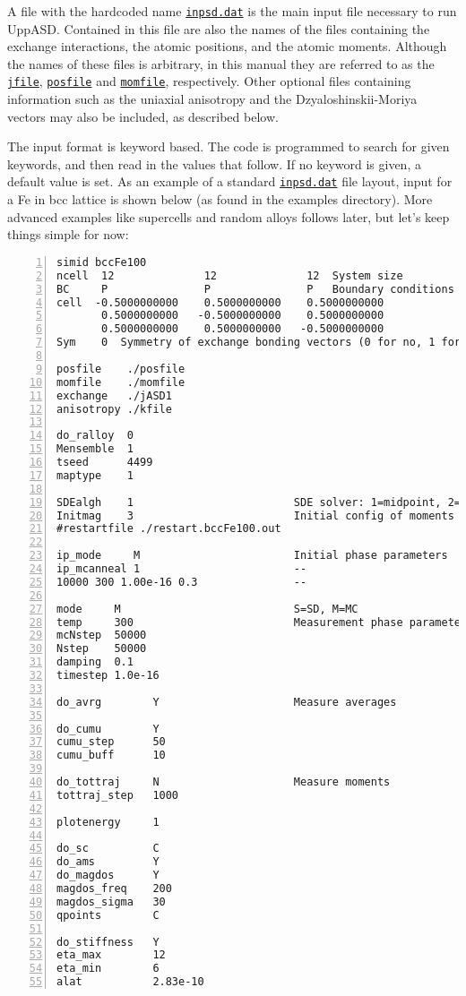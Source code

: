 \documentclass[11pt,fleqn,a4]{book} %
\newcommand{\rfilename}[1]{\hyperref[#1]{\texttt{#1}}}
\begin{document}
A file with the hardcoded name \rfilename{inpsd.dat} is the main input file necessary to run UppASD. Contained in this file are also the names of the files containing the exchange interactions, the atomic positions, and the atomic moments. Although the names of these files is arbitrary, in this manual they are referred to as the \rfilename{jfile}, \rfilename{posfile} and \rfilename{momfile}, respectively. Other optional files containing information such as the uniaxial anisotropy and the Dzyaloshinskii-Moriya vectors may also be included, as described below.

The input format is keyword based. The code is programmed to search for given keywords, and then read in the values that follow. If no keyword is given, a default value is set. As an example of a standard \rfilename{inpsd.dat} file layout, input for a Fe in bcc lattice is shown below (as found in the examples directory). More advanced examples like supercells and random alloys follows later, but let's keep things simple for now:

\begin{Verbatim}[numbers=left]
simid bccFe100                                    
ncell  12              12              12  System size            
BC     P               P               P   Boundary conditions (0=vacuum, P=periodic)
cell  -0.5000000000    0.5000000000    0.5000000000
       0.5000000000   -0.5000000000    0.5000000000
       0.5000000000    0.5000000000   -0.5000000000
Sym    0  Symmetry of exchange bonding vectors (0 for no, 1 for cubic, 2 for 2d cubic, 3 for hexagonal)

posfile    ./posfile
momfile    ./momfile
exchange   ./jASD1
anisotropy ./kfile

do_ralloy  0
Mensemble  1
tseed      4499
maptype    1

SDEalgh    1                         SDE solver: 1=midpoint, 2=heun, 3=heun3, 4=Heun_proper, 5=Depondt
Initmag    3                         Initial config of moments (1=random, 2=cone, 3=spec., 4=file)
#restartfile ./restart.bccFe100.out

ip_mode     M                        Initial phase parameters
ip_mcanneal 1                        --
10000 300 1.00e-16 0.3               --

mode     M                           S=SD, M=MC
temp     300                         Measurement phase parameters
mcNstep  50000
Nstep    50000
damping  0.1
timestep 1.0e-16

do_avrg        Y                     Measure averages

do_cumu        Y
cumu_step      50
cumu_buff      10

do_tottraj     N                     Measure moments
tottraj_step   1000

plotenergy     1

do_sc          C
do_ams         Y
do_magdos      Y
magdos_freq    200
magdos_sigma   30
qpoints        C

do_stiffness   Y
eta_max        12
eta_min        6
alat           2.83e-10
\end{Verbatim}
\end{document}
